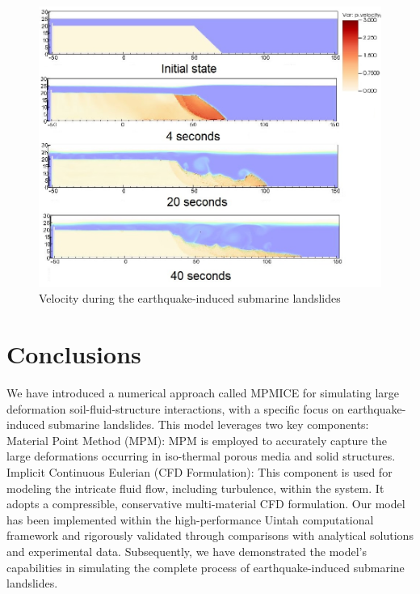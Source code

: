 \documentclass[preprint,12pt]{elsarticle}
\begin{document}
%
%
%
%
\begin{figure}[H]
\center
\includegraphics[scale=0.5]{landslide_vel.jpeg}
\caption{Velocity during the earthquake-induced submarine landslides}
\label{fig:vel}
\end {figure}
%
%
\section{\textsf{Conclusions}}
We have introduced a numerical approach called MPMICE for simulating large deformation soil-fluid-structure interactions, with a specific focus on earthquake-induced submarine landslides. This model leverages two key components: Material Point Method (MPM): MPM is employed to accurately capture the large deformations occurring in iso-thermal porous media and solid structures. Implicit Continuous Eulerian (CFD Formulation): This component is used for modeling the intricate fluid flow, including turbulence, within the system. It adopts a compressible, conservative multi-material CFD formulation. Our model has been implemented within the high-performance Uintah computational framework and rigorously validated through comparisons with analytical solutions and experimental data. Subsequently, we have demonstrated the model's capabilities in simulating the complete process of earthquake-induced submarine landslides.

\end{document}
